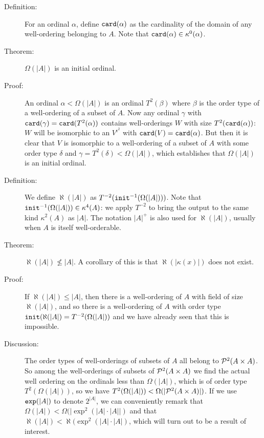 \documentclass[12pt]{article}
\begin{document}
\begin{description}
\item[Definition:]  For an ordinal $\alpha$, define ${\tt card}(\alpha)$ as the cardinality of the domain of any well-ordering belonging to $A$.  Note that ${\tt card}(\alpha) \in \kappa^0(\alpha)$.

\item[Theorem:]  $\Omega(|A|)$ is an initial ordinal. 

\item[Proof:]  An ordinal $\alpha<\Omega(|A|)$ is an ordinal $T^2(\beta)$ where $\beta$ is the order type of a well-ordering of a subset of $A$.  Now any ordinal $\gamma$ with ${\tt card}(\gamma) = {\tt card}(T^2(\alpha))$ contains well-orderings $W$ with size $T^2({\tt card}(\alpha))$:  $W$ will be isomorphic to an $V^{\iota^2}$ with ${\tt card}(V)= {\tt card}(\alpha)$.  But then it is clear that $V$ is isomorphic to a well-ordering of a subset of $A$ with some order type $\delta$ and $\gamma=T^2(\delta)<\Omega(|A|)$, which establishes that $\Omega(|A|)$ is an initial ordinal.

\item[Definition:]  We define $\aleph(|A|)$ as $T^{-2}({\tt init}^{-1}(\Omega(|A|)))$.  Note that ${\tt init}^{-1}(\Omega(|A|))\in \kappa^4(A)$:  we apply $T^{-2}$ to bring the output to the same kind $\kappa^2(A)$ as $|A|$.  The notation
$|A|^+$ is also used for  $\aleph(|A|)$, usually when $A$ is itself well-orderable.

\item[Theorem:]  $\aleph(|A|) \not\leq |A|$.   A corollary of this is that $\aleph(|\kappa(x)|)$ does not exist.

\item[Proof:]  If $\aleph(|A|) \leq |A|$, then there is a well-ordering of $A$ with field of size $\aleph(|A|)$, and so there is a well-ordering of $A$ with order type ${\tt init}(\aleph(|A|) = T^{-2}(\Omega(|A|))$ and we have already seen that this is impossible.

\item[Discussion:]  The order types of well-orderings of subsets of $A$ all belong to ${\cal P}^2(A \times A)$.  So among the well-orderings of subsets of ${\cal P}^2(A \times A)$ we find the actual well ordering on the ordinals less than  $\Omega(|A|)$, which is of order type $T^2(\Omega(|A|))$, so we have $T^2(\Omega(|A|))<\Omega(|{\cal P}^2(A \times A)|)$.  If we use ${\tt exp}(|A|)$ to denote $2^{|A|}$, we can conveniently remark that $\Omega(|A|)<\Omega(|\exp^2(|A|\cdot |A||)$ and that $\aleph(|A|)<\aleph(\exp^2(|A|\cdot |A|)$, which will turn out to be a result of interest.


\end{description}
\end{document}
